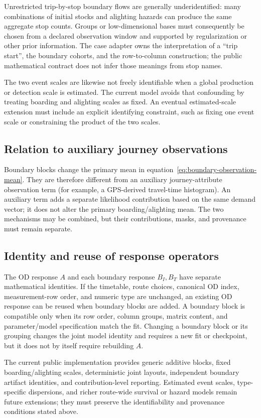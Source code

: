 Unrestricted trip-by-stop boundary flows are generally underidentified: many
combinations of initial stocks and alighting hazards can produce the same
aggregate stop counts.  Groups or low-dimensional bases must consequently be
chosen from a declared observation window and supported by regularization or
other prior information.  The case adapter owns the interpretation of a
``trip start'', the boundary cohorts, and the row-to-column construction; the
public mathematical contract does not infer those meanings from stop names.

The two event scales are likewise not freely identifiable when a global
production or detection scale is estimated.  The current model avoids that
confounding by treating boarding and alighting scales as fixed.  An eventual
estimated-scale extension must include an explicit identifying constraint,
such as fixing one event scale or constraining the product of the two scales.

\subsection{Relation to auxiliary journey observations}

Boundary blocks change the primary mean in equation~\eqref{eq:boundary-observation-mean}.
They are therefore different from an auxiliary journey-attribute observation
term (for example, a GPS-derived travel-time histogram).  An auxiliary term
adds a separate likelihood contribution based on the same demand vector; it
does not alter the primary boarding/alighting mean.  The two mechanisms may
be combined, but their contributions, masks, and provenance must remain
separate.

\subsection{Identity and reuse of response operators}

The OD response $A$ and each boundary response $B_I,B_T$ have separate
mathematical identities.  If the timetable, route choices, canonical OD
index, measurement-row order, and numeric type are unchanged, an existing
OD response can be reused when boundary blocks are added.  A boundary block
is compatible only when its row order, column groups, matrix content, and
parameter/model specification match the fit.  Changing a boundary block or
its grouping changes the joint model identity and requires a new fit or
checkpoint, but it does not by itself require rebuilding $A$.

The current public implementation provides generic additive blocks, fixed
boarding/alighting scales, deterministic joint layouts, independent boundary
artifact identities, and contribution-level reporting.  Estimated event
scales, type-specific dispersions, and richer route-wide survival or hazard
models remain future extensions; they must preserve the identifiability and
provenance conditions stated above.
